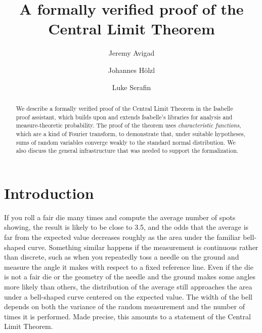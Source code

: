 \documentclass{svjour3}
\begin{document}
\title{A formally verified proof of the Central Limit Theorem}


\author{Jeremy Avigad \and Johannes H\"olzl \and Luke Serafin}



\maketitle

\begin{abstract}
We describe a formally verified proof of the Central Limit Theorem in the Isabelle proof assistant, which builds upon and extends Isabelle's libraries for analysis and measure-theoretic probability. 
The proof of the theorem uses \emph{characteristic functions}, which are a kind of Fourier transform, to demonstrate that, under suitable hypotheses, sums of random variables converge weakly to the standard normal distribution. We also discuss the general infrastructure that was needed to support the formalization.
\end{abstract}


\section{Introduction}
\label{section:introduction}

If you roll a fair die many times and compute the average number of spots showing, the result is likely to be close to 3.5, and the odds that the average is far from the expected value decreases roughly as the area under the familiar bell-shaped curve. Something similar happens if the measurement is continuous rather than discrete, such as when you repeatedly toss a needle on the ground and measure the angle it makes with respect to a fixed reference line. Even if the die is not a fair die or the geometry of the needle and the ground makes some angles more likely than others, the distribution of the average still approaches the area under a bell-shaped curve centered on the expected value. The width of the bell depends on both the variance of the random measurement and the number of times it is performed. Made precise, this amounts to a statement of the Central Limit Theorem.
\end{document}
